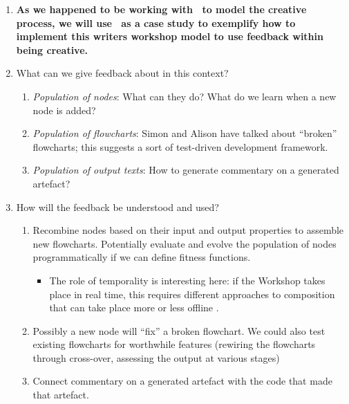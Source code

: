 \begin{enumerate}[start=3]
\item \textbf{As we happened to be working with \Fw\ to model the
  creative process, we will use \Fw\ as a case study to exemplify how
  to implement this writers workshop model to use feedback within
  being creative.}
\item[] What can we give feedback about in this context?
\begin{enumerate}
\item \emph{Population of nodes}: What can they do?  What do we learn when a
  new node is added?
\item \emph{Population of flowcharts}: Simon and Alison have talked
  about ``broken'' flowcharts; this suggests a sort of test-driven
  development framework.
\item \emph{Population of output texts}: How to generate commentary on
  a generated artefact?
\end{enumerate}
\item[] How will the feedback be understood and used?
\begin{enumerate}
\item Recombine nodes based on their input and output properties to
  assemble new flowcharts.  Potentially evaluate and evolve the
  population of nodes programmatically if we can define fitness
  functions.
\begin{itemize}
\item The role of temporality is interesting here: if the Workshop
  takes place in real time, this requires different approaches to
  composition that can take place more or less offline \cite{perez2013rolling}.
\end{itemize}
\item Possibly a new node will ``fix'' a broken flowchart.  We could also test existing flowcharts for worthwhile features (rewiring the flowcharts through cross-over, assessing the output at various stages)
\item Connect commentary on a generated artefact with the code that
  made that artefact.
\end{enumerate}
\end{enumerate}
